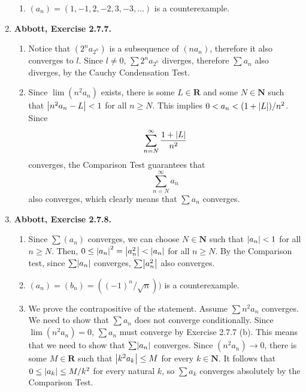 \documentclass{article}
\DeclarePairedDelimiter\abs{\lvert}{\rvert}
\newcommand{\N}{\mathbf{N}}
\newcommand{\R}{\mathbf{R}}
\newcommand{\exc}[2][Abbott]{\item \textbf{#1, Exercise #2.}}
\begin{document}
\begin{enumerate}
\begin{enumerate}
        \item $(a_n) = (1,-1,2,-2,3,-3, \dots)$ is a counterexample.
    \end{enumerate}
    
    \exc{2.7.7}
    \begin{enumerate}
        \item Notice that $(2^n a_{2^n})$ is a subsequence of $(n a_n)$, therefore it also converges to $l$. Since $l \neq 0$, $\sum 2^n a_{2^n}$ diverges, therefore $\sum a_n$ also diverges, by the Cauchy Condensation Test.
        
        \item Since $\lim(n^2 a_n)$ exists, there is some $L \in \R$ and some $N \in \N$ such that $\abs*{n^2 a_n - L} < 1$ for all $n \geq N$. This implies $0 < a_n < (1+\abs*{L})/n^2$. Since 
        \begin{equation*}
            \sum_{n = N}^\infty \frac{1+\abs*{L}}{n^2}
        \end{equation*} converges, the Comparison Test guarantees that 
        \begin{equation*}
            \sum_{n = N}^\infty a_n 
        \end{equation*} also converges, which clearly means that $\sum a_n$ converges.
    \end{enumerate}
    
    \exc{2.7.8}
    \begin{enumerate}
        \item Since $\sum (a_n)$ converges, we can choose $N \in \N$ such that $\abs*{a_n} < 1$ for all $n \geq N$. Then, $0 \leq \abs*{a_n}^2 = \abs*{a_n^2} < \abs*{a_n}$ for all $n \geq N$. By the Comparison test, since $\sum \abs*{a_n}$ converges, $\sum \abs*{a_n^2}$ also converges.
        
        \item $(a_n) = (b_n) = ((-1)^n/\sqrt{n}))$ is a counterexample.
        
        \item We prove the contrapositive of the statement. Assume $\sum n^2 a_n$ converges. We need to show that $\sum a_n$ does not converge conditionally. Since $\lim (n^2 a_n) = 0$, $\sum a_n$ must converge by Exercise 2.7.7 (b). This means that we need to show that $\sum \abs*{a_n}$ converges. Since $(n^2 a_n) \to 0$, there is some $M \in \R$ such that $\abs*{k^2 a_k} \leq M$ for every $k \in \N$. It follows that $0 \leq \abs*{a_k} \leq M/k^2$ for every natural $k$, so $\sum a_k$ converges absolutely by the Comparison Test.
    \end{enumerate}
    

\end{enumerate}
\end{document}
